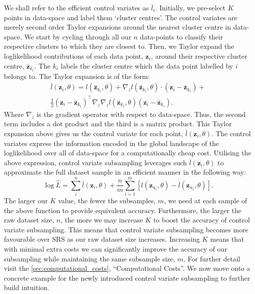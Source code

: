 We shall refer to the efficient control variates as $\bar{l}_i$. Initially, we pre-select $K$ points in data-space and label them `cluster centres'. The control variates are merely second order Taylor expansions around the nearest cluster centre in data-space. We start by cycling through all our $n$ data-points to classify their respective clusters to which they are closest to. Then, we Taylor expand the loglikelihood contributions of each data point, $\textbf{z}_i$, around their respective cluster centre, $\bar{\textbf{z}}_{k_{i}}$. The $k_{i}$ labels the cluster centre which the data point labelled by $i$ belongs to. The Taylor expansion is of the form:
%
\begin{equation}
\begin{aligned}
\bar{l}(\textbf{z}_i,\theta) = l(\bar{\textbf{z}}_{k_{i}},\theta)+ \nabla_z l(\bar{\textbf{z}}_{k_{i}},\theta) \cdot (\textbf{z}_i-\bar{\textbf{z}}_{k_{i}})+ \\ 
\frac{1}{2}(\textbf{z}_i-\bar{\textbf{z}}_{k_{i}})^\intercal  \nabla_z \nabla_z l(\bar{\textbf{z}}_{k_{i}},\theta)(\textbf{z}_i-\bar{\textbf{z}}_{k_{i}}).
\end{aligned}
\label{eq:taylor}
\end{equation}
%
Where $\nabla_z$ is the gradient operator with respect to data-space. Thus, the second term includes a dot product and the third is a matrix product. This Taylor expansion above gives us the control variate for each point, $\bar{l}(\textbf{z}_i,\theta)$. The control variates express the information encoded in the global landscape of the loglikelihood over all of data-space for a computationally cheap cost. 
Utilising the above expression, control variate subsampling leverages such $\bar{l}(\textbf{z}_i,\theta)$ to approximate the full dataset sample in an efficient manner in the following way:
\begin{equation}
    \log \hat{L}= \sum_{i}^{n} \bar{l}(\textbf{z}_i,\theta) + \frac{n}{m} \sum_{i=1}^{m} \left[ l(\textbf{z}_{u_i},\theta) - \bar{l}(\textbf{z}_{u_i},\theta) \right].
\label{cvv}
\end{equation}
%
The larger our $K$ value, the fewer the subsamples, $m$, we need at each sample of the above function to provide equivalent accuracy. Furthermore, the larger the raw dataset size, $n$, the more we may increase $K$ to boost the accuracy of control variate subsampling. This means that control variate subsampling becomes more favourable over SRS as our raw dataset size increases. Increasing $K$ means that with minimal extra costs we can significantly improve the accuracy of our subsampling while maintaining the same subsample size, $m$. For further detail visit the \cref{sec:computational_costs}, ``Computational Costs''. We now move onto a concrete example for the newly introduced control variate subsampling to further build intuition.


